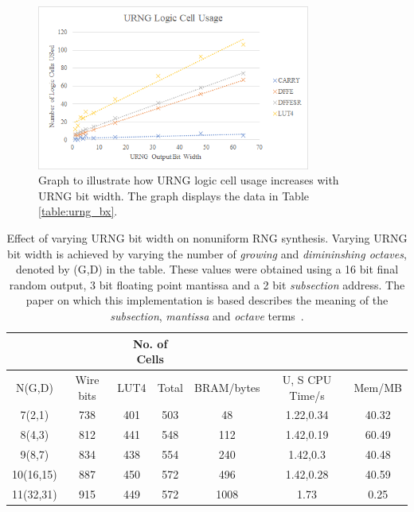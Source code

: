 \documentclass[12pt]{article}
\begin{document}
      \begin{figure}[H]
        \centering
        \includegraphics[width=0.8\textwidth]{fig/urng_graph.png}
        \caption{Graph to illustrate how URNG logic cell usage increases with URNG bit width. The graph displays the data in Table \ref{table:urng_bx}.}
        \label{fig:urng_graph}
      \end{figure}

      \begin{table}[H]
        \centering
        \begin{tabular}{|c||c|c|c|c|c|c|}
          \hline
          &  & \multicolumn{2}{|c|}{No. of Cells} & & &\\
          \hline
          N(G,D) & Wire bits & LUT4 & Total & BRAM/bytes & U, S CPU Time/s & Mem/MB\\
          \hline
          \hline
          7(2,1) & 738 & 401 & 503 & 48 & 1.22,0.34 & 40.32\\
          \hline
          8(4,3) & 812 & 441 & 548 & 112 & 1.42,0.19 & 60.49\\
          \hline
          9(8,7) & 834 & 438 & 554 & 240 & 1.42,0.3 & 40.48\\
          \hline
          10(16,15) & 887 & 450 & 572 & 496 & 1.42,0.28 & 40.59\\
          \hline
          11(32,31) & 915 & 449 & 572 & 1008 & 1.73 & 0.25\\
          \hline
        \end{tabular}
        \caption{Effect of varying URNG bit width on nonuniform RNG synthesis. Varying URNG bit width is achieved by varying the number of \textit{growing} and \textit{dimininshing octaves}, denoted by (G,D) in the table. These values were obtained using a 16 bit final random output, 3 bit floating point mantissa and a 2 bit \textit{subsection} address. The paper on which this implementation is based describes the meaning of the \textit{subsection}, \textit{mantissa} and \textit{octave} terms~\cite{DeSchryver}.}
        \label{table:rng_bx}
      \end{table}
\end{document}
